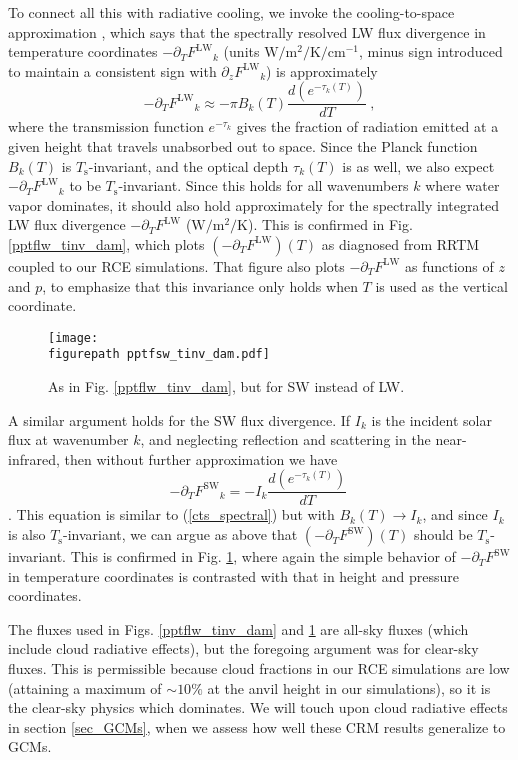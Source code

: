 \documentclass[10pt]{article}
\newcommand{\beqn}{\begin{equation}}
\newcommand{\eeqn}{\end{equation}}
\newcommand{\eqnref}[1]{(\ref{#1})}
\newcommand{\der}[2]{\ensuremath{\frac{d #1}{d #2}}}
\newcommand{\ppz}{\ensuremath{\partial_z}}
\newcommand{\ppt}{\ensuremath{\partial_T}}
\newcommand{\FLW}{\ensuremath{F^\mathrm{LW}}}
\newcommand{\FSW}{\ensuremath{F^\mathrm{SW}}}
\newcommand{\cminverse}{\ensuremath{\mathrm{cm^{-1}}}}
\newcommand{\tauk}{\ensuremath{\tau_k}}
\newcommand{\Wmsq}{\ensuremath{\mathrm{W/m^2}}}
\newcommand{\Ts}{\ensuremath{T_\mathrm{s}}}
\newcommand{\figurepath}{../figures/}
\begin{document}
	To connect all this with radiative cooling, we invoke the cooling-to-space  approximation \citep[e.g.,][]{thomas2002, rodgers1966}, which says that the spectrally resolved LW flux divergence in temperature coordinates $-\ppt \FLW_k$ (units $\Wmsq/\mathrm{K}/\cminverse$, minus sign introduced to maintain a consistent sign with  $\ppz \FLW_k$) is approximately
	\beqn
		-\ppt \FLW_k \approx - \pi B_k(T) \frac{d (e^{-\tauk(T)})}{dT} \ ,
	\label{cts_spectral}
	\eeqn
where  the transmission function $e^{-\tauk}$ gives the fraction of radiation emitted at a given height that travels unabsorbed out to space. Since the Planck function $B_k(T)$ is \Ts-invariant, and the optical depth $\tauk(T)$ is as well, we also expect $-\ppt \FLW_k$ to be \Ts-invariant. Since this holds for all wavenumbers $k$ where water vapor dominates, it should also hold approximately for the spectrally integrated LW flux divergence $-\ppt \FLW$ ($\Wmsq/\mathrm{K}$). This is confirmed in  Fig.  \ref{pptflw_tinv_dam}, which plots $(-\ppt \FLW)(T)$ as diagnosed from RRTM coupled to our  RCE simulations.  That figure also plots $-\ppt \FLW$ as functions of $z$ and $p$, to emphasize that this invariance only holds  when $T$ is used as the vertical coordinate.
\begin{figure}[t]
	\begin{center}
			\texttt{[image: \\figurepath pptfsw\_tinv\_dam.pdf]}
		\caption{As in Fig. \ref{pptflw_tinv_dam}, but for SW instead of LW.
		\label{pptfsw_tinv_dam}
		}
	\end{center}
\end{figure}


	A similar argument holds for the SW flux divergence. If $I_k$ is the incident solar flux at wavenumber $k$, and  neglecting reflection and scattering in the  near-infrared, 
then without further approximation we have
	\beqn
		-\ppt \FSW_k = - I_k \der{(e^{-\tauk(T)})}{T}
		\
	\eeqn
\citep[c.f.][eqn. 9.26]{thomas2002}. This equation is similar to  \eqnref{cts_spectral} but with $B_k(T) \rightarrow I_k$, and since $I_k$ is also \Ts-invariant, we can argue as above that $(-\ppt \FSW)(T)$ should be \Ts-invariant. This is confirmed in Fig. \ref{pptfsw_tinv_dam}, where again the simple behavior of $-\ppt \FSW$ in temperature coordinates is contrasted with that in height and pressure coordinates.



The fluxes used in Figs.  \ref{pptflw_tinv_dam} and \ref{pptfsw_tinv_dam} are all-sky fluxes (which include cloud radiative effects), but the foregoing argument was for clear-sky fluxes. This is permissible because cloud fractions in our RCE simulations are low (attaining a maximum of $\sim 10 \%$ at the anvil height in our simulations), so it is the clear-sky physics which dominates. We will touch upon cloud radiative effects in section \ref{sec_GCMs}, when we assess how well these CRM results generalize to GCMs.
 
\end{document}
